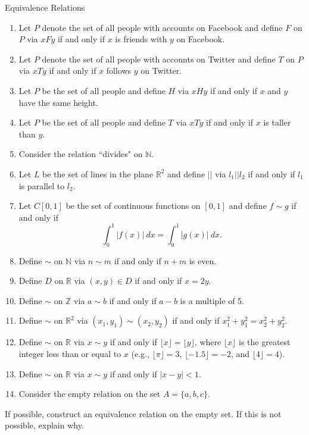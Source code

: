 \begin{section}{Equivalence Relations}
\begin{problem}
\begin{enumerate}[label=\textrm{(\alph*)}]
\item\label{prob:facebook} Let $P$ denote the set of all people with accounts on Facebook and define $F$ on $P$ via $xFy$ if and only if $x$ is friends with $y$ on Facebook. 
\item\label{prob:twitter} Let $P$ denote the set of all people with accounts on Twitter and define $T$ on $P$ via $xTy$ if and only if $x$ follows $y$ on Twitter. 
\item Let $P$ be the set of all people and define $H$ via $xHy$ if and only if $x$ and $y$ have the same height.
\item Let $P$ be the set of all people and define $T$ via $xTy$ if and only if $x$ is taller than $y$.
\item Consider the relation ``divides" on $\mathbb{N}$.
\item Let $L$ be the set of lines in the plane $\mathbb{R}^2$ and define $||$ via $l_1||l_2$ if and only if $l_1$ is parallel to $l_2$.
\item Let $C[0,1]$ be the set of continuous functions on $[0,1]$ and define $f\sim g$ if and only if
\[
\int_0^1|f(x)|\ dx=\int_0^1|g(x)|\ dx.
\]
\item Define $\sim$ on $\mathbb{N}$ via $n\sim m$ if and only if $n+m$ is even.
\item Define $D$ on $\mathbb{R}$ via $(x,y)\in D$ if and only if $x=2y$.
\item\label{prob:mod 5} Define $\sim$ on $\mathbb{Z}$ via $a\sim b$ if and only if $a-b$ is a multiple of 5.
\item Define $\sim$ on $\mathbb{R}^2$ via $(x_1,y_1)\sim (x_2,y_2)$ if and only if $x_1^2+y_1^2=x_2^2+y_2^2$.
\item Define $\sim$ on $\mathbb{R}$ via $x\sim y$ if and only if $\lfloor x\rfloor =\lfloor y\rfloor$, where $\lfloor x\rfloor$ is the greatest integer less than or equal to $x$ (e.g., $\lfloor \pi\rfloor=3$, $\lfloor -1.5\rfloor=-2$, and $\lfloor 4\rfloor=4$).
\item Define $\sim$ on $\mathbb{R}$ via $x \sim y$ if and only if $|x-y|<1$.
\item Consider the empty relation on the set $A=\{a,b,c\}$.
\end{enumerate}
\end{problem}

\begin{problem}
If possible, construct an equivalence relation on the empty set.  If this is not possible, explain why.
\end{problem}


\end{section}
